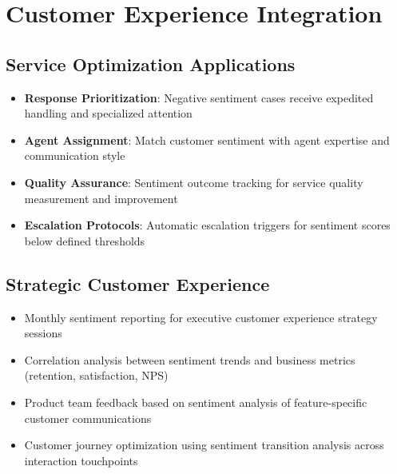 \documentclass[11pt]{article}
\begin{document}
\section{Customer Experience Integration}

\subsection{Service Optimization Applications}
\begin{itemize}
\item \textbf{Response Prioritization}: Negative sentiment cases receive expedited handling and specialized attention
\item \textbf{Agent Assignment}: Match customer sentiment with agent expertise and communication style
\item \textbf{Quality Assurance}: Sentiment outcome tracking for service quality measurement and improvement
\item \textbf{Escalation Protocols}: Automatic escalation triggers for sentiment scores below defined thresholds
\end{itemize}

\subsection{Strategic Customer Experience}
\begin{itemize}
\item Monthly sentiment reporting for executive customer experience strategy sessions
\item Correlation analysis between sentiment trends and business metrics (retention, satisfaction, NPS)
\item Product team feedback based on sentiment analysis of feature-specific customer communications
\item Customer journey optimization using sentiment transition analysis across interaction touchpoints
\end{itemize}
\end{document}
